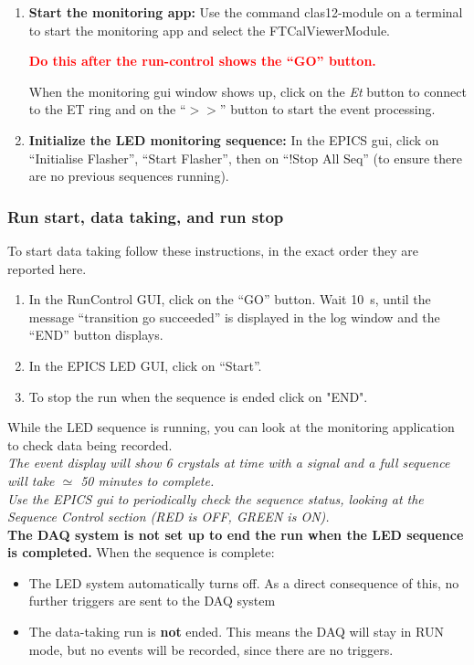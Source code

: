 \documentclass[11.5pt]{article}
\begin{document}
\begin{enumerate}
{\begin{itemize}
{ }
\end{itemize}
}
\item{\textbf{Start the monitoring app: }Use the command clas12-module on a terminal to start the monitoring app and select the FTCalViewerModule.

\textcolor{red}{\bf Do this after the run-control shows the ``GO'' button.}

When the monitoring gui window shows up, click on the {\it Et} button to connect to the ET ring and on the ``$>>$'' button to start the event processing. }
\item{\textbf{Initialize the LED monitoring sequence:} In the EPICS gui, click on ``Initialise Flasher'', ``Start Flasher'', then on ``!Stop All Seq'' (to ensure there are no previous sequences running). 
}
\end{enumerate}
      
\subsubsection{Run start, data taking, and run stop}
To start data taking follow these instructions, in the exact order they are reported here.
\begin{enumerate}
\item In the RunControl GUI, click on the ``GO'' button. Wait 10~s, until the message ``transition go succeeded'' is displayed in the log window and the ``END'' button displays. 
\item In the EPICS LED GUI, click on ``Start''.
\item To stop the run when the sequence is ended click on "END".
\end{enumerate}

While the LED sequence is running, you can look at the monitoring application to check data being recorded. \\
\textit{The event display will show 6 crystals at time with a signal and a full sequence will take $\simeq$ 50 minutes to complete.}\\
\textit{Use the EPICS gui to periodically check the sequence status, looking at the Sequence Control section (RED is OFF, GREEN is ON). }\\
{\bf  The DAQ system is not set up to end the run when the LED sequence is completed.} When the sequence is complete:
\begin{itemize}
\item The LED system automatically turns off. As a direct consequence of this, no further triggers are sent to the DAQ system
\item The data-taking run is \textbf{not} ended. This means the DAQ will stay in RUN mode, but no events will be recorded, since there are no triggers.
\end{itemize}
\end{document}
